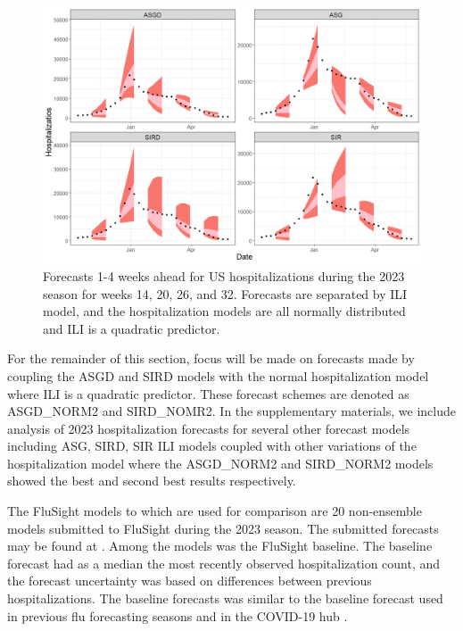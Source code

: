 \begin{figure}[hbt!]

  \centering
  \begin{adjustwidth}{-1cm}{-1.9cm}
  \includegraphics[scale=.45]{Images/normal_sq_forecasts_us.png}
  \end{adjustwidth}
\caption{Forecasts 1-4 weeks ahead for US hospitalizations during the 2023 
season for weeks 14, 20, 26, and 32. Forecasts are separated by ILI model, 
and the hospitalization models are all normally distributed and ILI is a 
quadratic predictor.}
\label{fig:normal_flu_forecasts}
\end{figure}

For the
remainder of this section, focus will be made on forecasts made by coupling the
ASGD and SIRD models with the 
normal hospitalization model where ILI is a quadratic predictor.
These forecast schemes are denoted as ASGD\_NORM2 and SIRD\_NOMR2. 
In the supplementary materials, we include analysis of 2023 hospitalization
forecasts for several other forecast
models including ASG, SIRD, SIR ILI models coupled with other variations of the
hospitalization model where the ASGD\_NORM2 and SIRD\_NORM2 models
showed the best and second best results respectively.


The FluSight 
models to which are used for comparison are
20 non-ensemble models
submitted to FluSight during the 2023 season.
The submitted forecasts may be found at \cite{mathis2023flusight}.
Among the models
was the FluSight baseline. The baseline forecast had as a median the most 
recently observed 
hospitalization count, and the forecast uncertainty was based on 
differences between 
previous hospitalizations. The baseline forecasts was
similar to the baseline forecast used in
previous flu forecasting seasons and in the COVID-19 hub 
\cite[]{mathis2024evaluation, Cramer2022-hub-dataset}.


